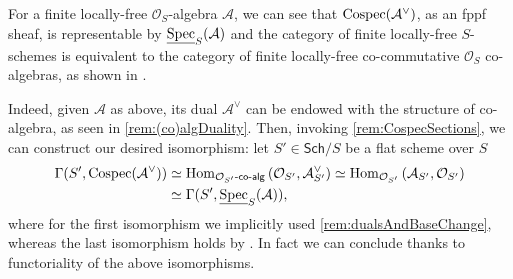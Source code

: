 \begin{rem}\label{rem:represCospec}
	For a finite locally-free $\mathcal{O}_{ S }$-algebra $\mathcal{A}$,
	we can see that $\operatorname{Cospec}(\mathcal{A}^{\vee})$, as an fppf sheaf, is representable 
	by $\underline{\operatorname{Spec}}_S(\mathcal{A})$ and
	the category of finite locally-free $S$-schemes
	is equivalent to the category of finite locally-free co-commutative
	$\mathcal{O}_{ S }$ co-algebras, as shown in 
	\cite[Chapter III, remark 2.1.2]{Messing}.

	Indeed, given $\mathcal{A}$ as above, its dual
	$\mathcal{A}^{\vee}$ can be endowed with the structure of co-algebra, 
	as seen in \cref{rem:(co)algDuality}.
	Then, invoking \cref{rem:CospecSections}, we can construct 
	our desired isomorphism: let $S' \in \mathsf{Sch}/S$
	be a flat scheme over \(S\)
	\begin{align*}
		\Gamma(S', \operatorname{Cospec}(\mathcal{A}^{\vee})) &\simeq
		\operatorname{Hom}_{ \mathcal{O}_{ S' }\text{-}\mathsf{co}\text{-}\mathsf{alg}} 
		\left( \mathcal{O}_{ S' }, \mathcal{A}^\vee_{S'} \right) \simeq
		\operatorname{Hom}_{ \mathcal{O}_{ S' }}
		\left( \mathcal{A}_{S'}, \mathcal{O}_{ S' } \right) \\
		&\simeq
		\Gamma(S', \underline{\operatorname{Spec}}_S(\mathcal{A}))
	,\end{align*}
	where for the first isomorphism we implicitly used
	\cref{rem:dualsAndBaseChange},
	whereas the last isomorphism holds by 
	\cite[\href{https://stacks.math.columbia.edu/tag/01LV}{Lemma 01LV}]{SP}.
	In fact we can conclude thanks to functoriality of the above isomorphisms.
\end{rem}


